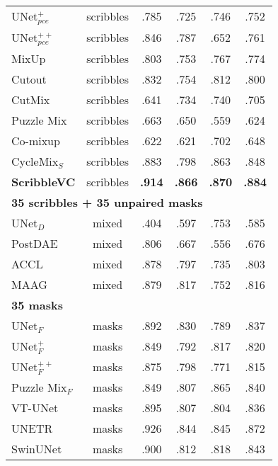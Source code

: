 \documentclass[sigconf,natbib=false]{acmart}
\begin{document}
\begin{table}[!ht]
{\begin{tabular}{l|c|ccc|c}
    UNet$^{+}_{pce}$\cite{unet+} & scribbles & .785 & .725 & .746 & .752 \\
    UNet$^{++}_{pce}$\cite{unet++} & scribbles & .846 & .787 & .652 & .761 \\
    MixUp\cite{mixup} & scribbles & .803 & .753 & .767 & .774 \\
    Cutout\cite{cutout} & scribbles & .832 & .754 & .812 & .800 \\
    CutMix\cite{cutmix} & scribbles & .641 & .734 & .740 & .705 \\
    Puzzle Mix\cite{puzzlemix} & scribbles & .663 & .650 & .559 & .624 \\
    Co-mixup\cite{comixup} & scribbles & .622 & .621 & .702 & .648 \\
    CycleMix$_S$\cite{Zhang_2022_CycleMix} & scribbles & .883 & .798 & .863 & .848 \\
    \rowcolor{mygray}
    \textbf{ScribbleVC} & scribbles & \textbf{.914} & \textbf{.866} & \textbf{.870} & \textbf{.884} \\ \hline
    \multicolumn{6}{l}{\textbf{35 scribbles + 35 unpaired masks}} \\ \hline
    UNet$_D$\cite{MAAG} & mixed & .404 & .597 & .753 & .585 \\
    PostDAE\cite{postdae} & mixed & .806 & .667 & .556 & .676 \\
    ACCL\cite{accl}  & mixed & .878 & .797 & .735 & .803 \\
    MAAG\cite{MAAG}  & mixed & .879 & .817 & .752 & .816 \\ \hline
    \multicolumn{6}{l}{\textbf{35 masks}} \\ \hline
    UNet$_F$\cite{unet} & masks & .892 & .830 & .789 & .837 \\
    UNet$^+_F$\cite{unet+} & masks & .849 & .792 & .817 & .820 \\
    UNet$^{++}_F$\cite{unet++} & masks & .875 & .798 & .771 & .815 \\
    Puzzle Mix$_F$\cite{puzzlemix} & masks &.849 & .807 & .865 & .840 \\
    VT-UNet & masks & .895 & .807 & .804 & .836 \\
    UNETR\cite{Hatamizadeh_2022_WACV} & masks & .926 & .844 & .845 & .872 \\
    SwinUNet\cite{swinunet} & masks & .900 & .812 & .818 & .843 \\
    \bottomrule[1pt]
    \end{tabular}}
  \label{ACDCresult}\vspace{-6mm}
\end{table}
\vspace{-4mm}
\end{document}
